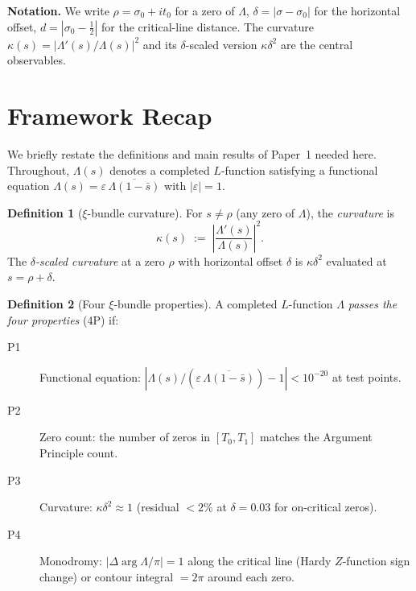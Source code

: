 \documentclass[11pt, a4paper]{article}
\theoremstyle{plain}
\theoremstyle{definition}
\newtheorem{definition}{Definition}[section]
\begin{document}
\noindent\textbf{Notation.} We write $\rho = \sigma_{0}+it_{0}$ for a
zero of $\Lambda$, $\delta=|\sigma-\sigma_{0}|$ for the horizontal
offset, $d=|\sigma_{0}-\tfrac{1}{2}|$ for the critical-line distance.
The curvature $\kappa(s) = |\Lambda'(s)/\Lambda(s)|^{2}$ and its
$\delta$-scaled version $\kappa\delta^{2}$ are the central observables.


\section{Framework Recap}
\label{sec:recap}

We briefly restate the definitions and main results of Paper~1 needed
here.  Throughout, $\Lambda(s)$ denotes a completed $L$-function
satisfying a functional equation $\Lambda(s) = \varepsilon\,
\overline{\Lambda(1-\bar{s})}$ with $|\varepsilon|=1$.

\begin{definition}[$\xi$-bundle curvature]
  For $s\neq\rho$ (any zero of $\Lambda$), the \emph{curvature} is
  \[
    \kappa(s) \;:=\; \left|\frac{\Lambda'(s)}{\Lambda(s)}\right|^{2}.
  \]
  The \emph{$\delta$-scaled curvature} at a zero $\rho$ with horizontal
  offset $\delta$ is $\kappa\delta^{2}$ evaluated at $s = \rho+\delta$.
\end{definition}

\begin{definition}[Four $\xi$-bundle properties]
  A completed $L$-function $\Lambda$ \emph{passes the four properties}
  (4P) if:
  \begin{description}
    \item[P1] Functional equation: $|\Lambda(s)/(\varepsilon\,
      \overline{\Lambda(1-\bar{s})})-1|<10^{-20}$ at test points.
    \item[P2] Zero count: the number of zeros in $[T_{0}, T_{1}]$
      matches the Argument Principle count.
    \item[P3] Curvature: $\kappa\delta^{2}\approx 1$ (residual $<2\%$
      at $\delta=0.03$ for on-critical zeros).
    \item[P4] Monodromy: $|{}\Delta\!\arg\Lambda\!/\pi|=1$ along the
      critical line (Hardy $Z$-function sign change) or contour
      integral $=2\pi$ around each zero.
  \end{description}
\end{definition}
\end{document}

